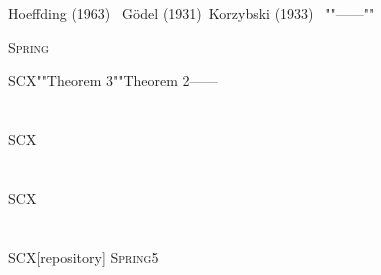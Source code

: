 \documentclass[12pt,a4paper]{article}
\theoremstyle{remark}
\newcommand{\Spring}{\textsc{Spring}}
\begin{document}
Hoeffding (1963)~\cite{hoeffding1963}
G\"odel (1931)~\cite{godel1931}Korzybski (1933)~\cite{korzybski1933}
""——""

\Spring{}

SCX""Theorem 3""Theorem 2——



\section*{}
SCX

\section*{}
SCX


\section*{}


\section*{}
SCX[repository]
\Spring{}5

\newpage
\end{document}
